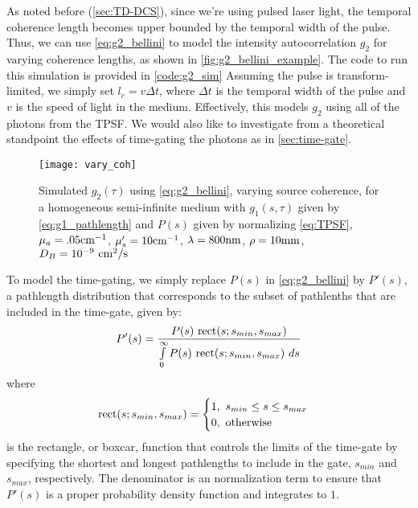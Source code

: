 As noted before (\autoref{sec:TD-DCS}), since we're using pulsed laser light, the temporal coherence length becomes upper bounded by the temporal width of the pulse. Thus, we can use \autoref{eq:g2_bellini} to model the intensity autocorrelation $g_2$ for varying coherence lengths, as shown in \autoref{fig:g2_bellini_example}. The code to run this simulation is provided in \autoref{code:g2_sim} Assuming the pulse is transform-limited, we simply set $l_c = v\Delta t$, where $\Delta t$ is the temporal width of the pulse and $v$ is the speed of light in the medium. Effectively, this models $g_2$ using all of the photons from the TPSF. We would also like to investigate from a theoretical standpoint the effects of time-gating the photons as in \autoref{sec:time-gate}.

\begin{figure}[tb]
    \centering
    \texttt{[image: vary\_coh]} 
    \caption{Simulated $g_2(\tau)$ using \autoref{eq:g2_bellini}, varying source coherence, for a homogeneous semi-infinite medium with $g_1(s,\tau)$ given by \autoref{eq:g1_pathlength} and $P(s)$ given by normalizing \autoref{eq:TPSF}, $\mu_a=.05 \textnormal{cm}^{-1}$, $\mu_s'=10 \textnormal{cm}^{-1}$, $\lambda=800\textnormal{nm}$, $\rho=10 \textnormal{mm}$, $D_B=10^{-9} \textnormal{ cm}^2/\textnormal{s}$}
    \label{fig:g2_bellini_example}
\end{figure}

To model the time-gating, we simply replace $P(s)$ in \autoref{eq:g2_bellini} by $P'(s)$, a pathlength distribution that corresponds to the subset of pathlenths that are included in the time-gate, given by:
\begin{equation} \label{eq:modified_bellini_pdf}
P'(s) = \frac{P(s)~\textnormal{rect}(s; s_{min}, s_{max})}{\int\limits_{0}^{\infty} P(s)~\textnormal{rect}(s; s_{min}, s_{max}) ~ds}   
\end{equation}
where
\begin{equation}
\textnormal{rect}(s; s_{min}, s_{max}) = 
\begin{cases}
1,~s_{min} \leq s \leq s_{max} \\
0,~\textnormal{otherwise} \\
\end{cases}
\end{equation} 
is the rectangle, or boxcar, function that controls the limits of the time-gate by specifying the shortest and longest pathlengths to include in the gate, $s_{min}$ and $s_{max}$, respectively. The denominator is an normalization term to ensure that $P'(s)$ is a proper probability density function and integrates to $1$. 


